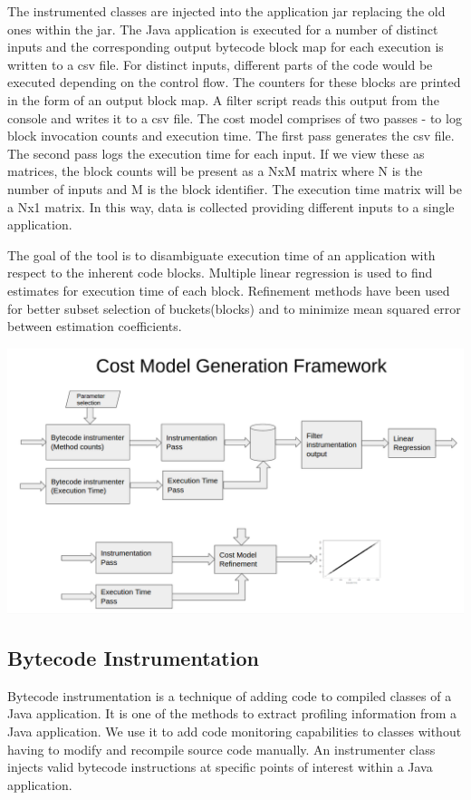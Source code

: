 \documentclass[11pt]{article}
\begin{document}
The instrumented classes are injected into the application jar replacing the old ones within the jar. The Java application is executed for a number of distinct inputs and the corresponding output bytecode block map for each execution is written to a csv file. For distinct inputs, different parts of the code would be executed depending on the control flow. The counters for these blocks are printed in the form of an output block map. A filter script reads this output from the console and writes it to a csv file. The cost model comprises of two passes - to log block invocation counts and execution time. The first pass generates the csv file. The second pass logs the execution time for each input. If we view these as matrices, the block counts will be present as a NxM matrix where N is the number of inputs and M is the block identifier. The execution time matrix will be a Nx1 matrix. In this way, data is collected providing different inputs to a single application. \newline

The goal of the tool is to disambiguate execution time of an application with respect to the inherent code blocks. Multiple linear regression is used to find estimates for execution time of each block. Refinement methods have been used for better subset selection of buckets(blocks) and to minimize mean squared error between estimation coefficients.

\includegraphics[scale=0.38]{./images/costmodelframework.png}

\subsection{Bytecode Instrumentation}
Bytecode instrumentation is a technique of adding code to compiled classes of a Java application. It is one of the methods to extract profiling information from a Java application. We use it to add code monitoring capabilities to classes without having to modify and recompile source code manually. An instrumenter class injects valid bytecode instructions at specific points of interest within a Java application.\citep{javabytecode}\newline
\end{document}
